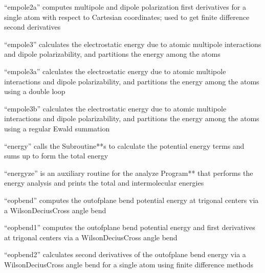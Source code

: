 \documentclass[letterpaper,11pt,english]{sphinxmanual}
\begin{document}

“empole2a” computes multipole and dipole polarization first derivatives for a single atom with respect to Cartesian coordinates; used to get finite difference second derivatives


“empole3” calculates the electrostatic energy due to atomic multipole interactions and dipole polarizability, and partitions the energy among the atoms


“empole3a” calculates the electrostatic energy due to atomic multipole interactions and dipole polarizability, and partitions the energy among the atoms using a double loop


“empole3b” calculates the electrostatic energy due to atomic multipole interactions and dipole polarizability, and partitions the energy among the atoms using a regular Ewald summation


“energy” calls the Subroutine**s to calculate the potential energy terms and sums up to form the total energy


“energyze” is an auxiliary routine for the analyze Program** that performs the energy analysis and prints the total and intermolecular energies


“eopbend” computes the out\sphinxhyphen{}of\sphinxhyphen{}plane bend potential energy at trigonal centers via a Wilson\sphinxhyphen{}Decius\sphinxhyphen{}Cross angle bend


“eopbend1” computes the out\sphinxhyphen{}of\sphinxhyphen{}plane bend potential energy and first derivatives at trigonal centers via a Wilson\sphinxhyphen{}Decius\sphinxhyphen{}Cross angle bend


“eopbend2” calculates second derivatives of the out\sphinxhyphen{}of\sphinxhyphen{}plane bend energy via a Wilson\sphinxhyphen{}Decius\sphinxhyphen{}Cross angle bend for a single atom using finite difference methods
\end{document}
